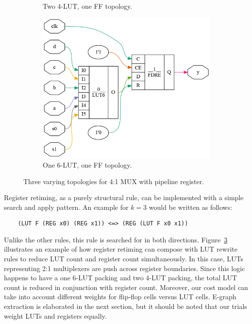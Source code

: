 \begin{figure}[tb]
\begin{subfigure}{0.33\textwidth}
        \caption{Two 4-LUT, one FF topology.}\label{fig:retiming:b}
        \Description[]{}
    \end{subfigure}
    \begin{subfigure}{0.33\textwidth}
        \centering
        \includegraphics[width=\textwidth]{img/mux_4_1_retime.png}
        \caption{One 6-LUT, one FF topology.}\label{fig:retiming:c}
        \Description[]{}
    \end{subfigure}
    \caption{Three varying topologies for 4:1 MUX with pipeline register. }\label{fig:retiming}
    \Description[]{}
\end{figure}

Register retiming, as a purely structural rule, can be implemented with a
simple search and apply pattern. An example for $k=3$ would be written as
follows:

\begin{verbatim}
    (LUT F (REG x0) (REG x1)) <=> (REG (LUT F x0 x1))
\end{verbatim}

Unlike the other rules, this rule is searched for in both directions.
Figure~\ref{fig:retiming} illustrates an example of how register retiming can
compose with LUT rewrite rules to reduce LUT count and register count
simultaneously. In this case, LUTs representing 2:1 multiplexers are push
across register boundaries. Since this logic happens to have a one 6-LUT
packing and two 4-LUT packing, the total LUT count is reduced in conjunction
with register count. Moreover, our cost model can take into account different
weights for flip-flop cells versus LUT cells. E-graph extraction is elaborated
in the next section, but it should be noted that our trials weight LUTs and
registers equally.
